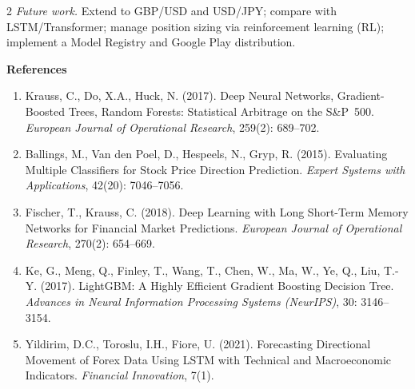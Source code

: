 \begin{multicols*}{2}
\emph{Future work.} Extend to GBP/USD and USD/JPY; compare with LSTM/Transformer; manage position sizing via reinforcement learning (RL); implement a Model Registry and Google Play distribution.

\noindent\textbf{References}

\begingroup
\scriptsize
\setlength{\parskip}{2pt}
\begin{enumerate}\setlength\itemsep{1pt}\setlength\parsep{0pt}\setlength\topsep{0pt}
    \item Krauss, C., Do, X.A., Huck, N. (2017). Deep Neural Networks, Gradient-Boosted Trees, Random Forests: Statistical Arbitrage on the S\&P~500. \emph{European Journal of Operational Research}, 259(2): 689--702.
    \item Ballings, M., Van den Poel, D., Hespeels, N., Gryp, R. (2015). Evaluating Multiple Classifiers for Stock Price Direction Prediction. \emph{Expert Systems with Applications}, 42(20): 7046--7056.
    \item Fischer, T., Krauss, C. (2018). Deep Learning with Long Short-Term Memory Networks for Financial Market Predictions. \emph{European Journal of Operational Research}, 270(2): 654--669.
    \item Ke, G., Meng, Q., Finley, T., Wang, T., Chen, W., Ma, W., Ye, Q., Liu, T.-Y. (2017). LightGBM: A Highly Efficient Gradient Boosting Decision Tree. \emph{Advances in Neural Information Processing Systems (NeurIPS)}, 30: 3146--3154.
    \item Yildirim, D.C., Toroslu, I.H., Fiore, U. (2021). Forecasting Directional Movement of Forex Data Using LSTM with Technical and Macroeconomic Indicators. \emph{Financial Innovation}, 7(1).
\end{enumerate}
\endgroup

\end{multicols*}
